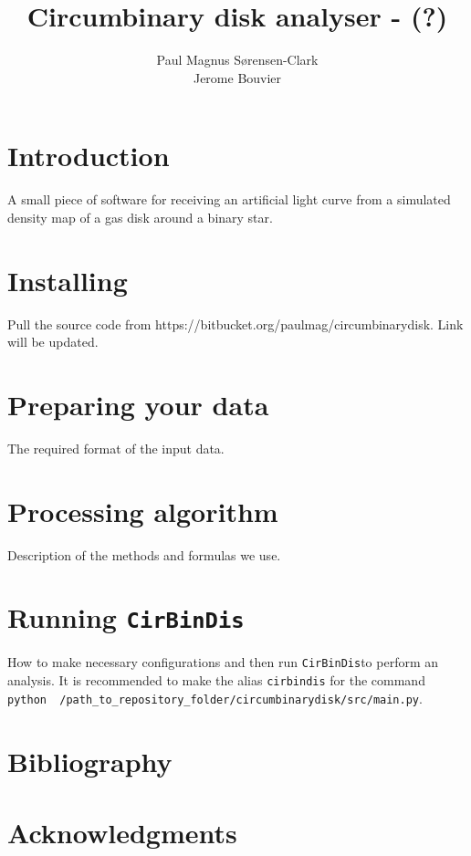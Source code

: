 \documentclass[a4paper, 12pt, english, titlepage]{article}
\title{Circumbinary disk analyser - \sname(?)}
\author{Paul Magnus Sørensen-Clark \\ Jerome Bouvier}
\newcommand{\sname}{\texttt{CirBinDis}}
\begin{document}
\maketitle


\section{Introduction}

A small piece of software for receiving an artificial light curve from a simulated density map of a gas disk around a binary star.

\section{Installing}

Pull the source code from https://bitbucket.org/paulmag/circumbinarydisk. Link will be updated.

\section{Preparing your data}

The required format of the input data.

\section{Processing algorithm}

Description of the methods and formulas we use.

\section{Running \sname}

How to make necessary configurations and then run \sname to perform an analysis. It is recommended to make the alias \texttt{cirbindis} for the command \texttt{python ~/path\_to\_repository\_folder/circumbinarydisk/src/main.py}.

\section{Bibliography}



\section{Acknowledgments}
\end{document}
